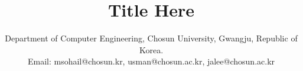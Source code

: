 \documentclass[conference]{IEEEtran}
\makeatletter
\newcommand{\linebreakand}{%
  \end{@IEEEauthorhalign}
  \hfill\mbox{}\par
  \mbox{}\hfill\begin{@IEEEauthorhalign}
}
\makeatother
\begin{document}
\title{Title Here\\
}


\author{
 	
 	Department of Computer Engineering, Chosun University, Gwangju, Republic of Korea.\\
 		Email: msohail@chosun.kr, usman@chosun.ac.kr, jalee@chosun.ac.kr\\
		}

\maketitle
\end{document}
